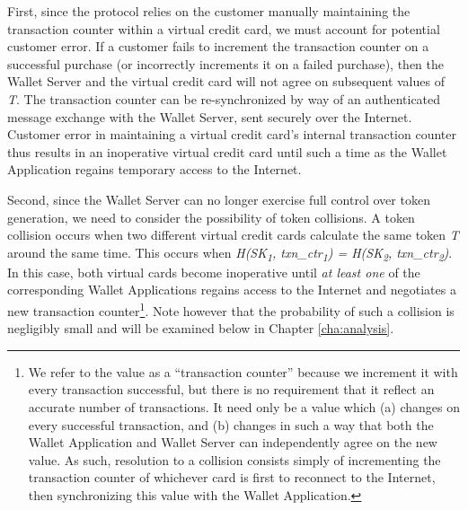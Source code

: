 First, since the protocol relies on the customer manually maintaining the transaction counter within a virtual credit card,
    we must account for potential customer error.
If a customer fails to increment the transaction counter on a successful purchase (or incorrectly increments it on a failed purchase),
    then the Wallet Server and the virtual credit card will not agree on subsequent values of \emph{T}.
The transaction counter can be re-synchronized by way of an authenticated message exchange with the Wallet Server, sent securely over the Internet.
Customer error in maintaining a virtual credit card's internal transaction counter thus results in an inoperative virtual credit card
    until such a time as the Wallet Application regains temporary access to the Internet.

Second, since the Wallet Server can no longer exercise full control over token generation, we need to consider the possibility of token collisions.
A token collision occurs when two different virtual credit cards calculate the same token \emph{T} around the same time.
This occurs when \emph{H(SK\textsubscript{1}, txn\_ctr\textsubscript{1}) = H(SK\textsubscript{2}, txn\_ctr\textsubscript{2})}.
In this case, both virtual cards become inoperative until \emph{at least one} of the corresponding Wallet Applications regains access to the Internet
    and negotiates a new transaction counter\footnote{
    We refer to the value as a ``transaction counter'' because we increment it with every transaction successful,
        but there is no requirement that it reflect an accurate number of transactions.
    It need only be a value which (a) changes on every successful transaction, and
        (b) changes in such a way that both the Wallet Application and Wallet Server can independently agree on the new value.
    As such, resolution to a collision consists simply of incrementing the transaction counter of whichever card is first to reconnect to the Internet,
        then synchronizing this value with the Wallet Application.
    }.
Note however that the probability of such a collision is negligibly small and will be examined below in Chapter \ref{cha:analysis}.
